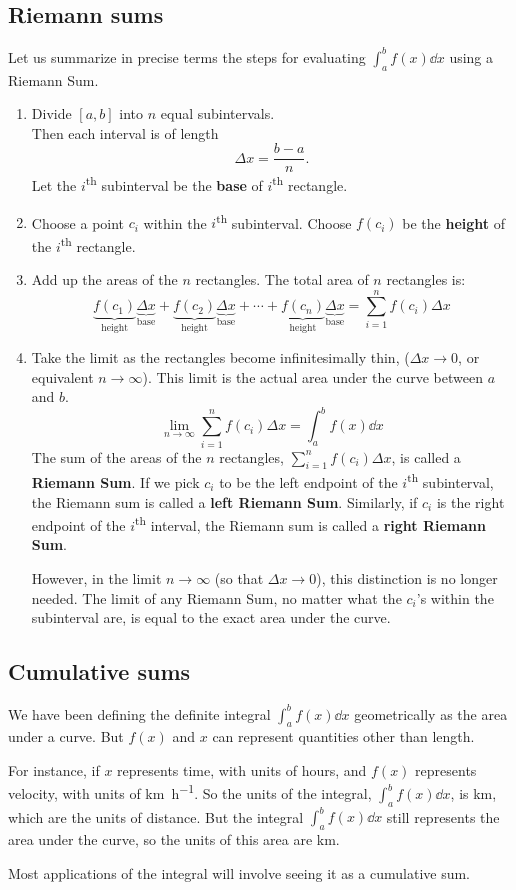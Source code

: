 \subsection{Riemann sums}
Let us summarize in precise terms the steps for evaluating $\int_a^bf(x)\dd x$ using a Riemann Sum.
\begin{enumerate}
\item Divide $[a,b]$ into $n$ equal subintervals.
  \\
  Then each interval is of length
  \[\Delta x=\frac{b-a}n.\]
  Let the $i$\textsuperscript{th} subinterval be the \textbf{base} of $i$\textsuperscript{th} rectangle.
\item Choose a point $c_i$ within the $i$\textsuperscript{th} subinterval. Choose $f(c_i)$ be the \textbf{height} of the $i$\textsuperscript{th} rectangle.
\item Add up the areas of the $n$ rectangles. The total area of $n$ rectangles is:
  \[\underbrace{f(c_1)}_{\text{height}}\underbrace{\Delta x}_{\text{base}}
  +\underbrace{f(c_2)}_{\text{height}}\underbrace{\Delta x}_{\text{base}}
  +\cdots
  +\underbrace{f(c_n)}_{\text{height}}\underbrace{\Delta x}_{\text{base}}
  =\sum_{i=1}^nf(c_i)\Delta x
  \]
\item Take the limit as the rectangles become infinitesimally thin, ($\Delta x\to0$, or equivalent $n\to\infty$). This limit is the actual area under the curve between $a$ and $b$.
  \[\lim_{n\to\infty}\sum_{i=1}^nf(c_i)\Delta x=\int_a^bf(x)\dd x\]
  The sum of the areas of the $n$ rectangles, $\sum_{i=1}^nf(c_i)\Delta x$, is called a \textbf{Riemann Sum}. If we pick $c_i$ to be the left endpoint of the $i$\textsuperscript{th} subinterval, the Riemann sum is called a \textbf{left Riemann Sum}. Similarly, if $c_i$ is the right endpoint of the $i$\textsuperscript{th} interval, the Riemann sum is called a \textbf{right Riemann Sum}.

  However, in the limit $n\to\infty$ (so that $\Delta x\to0$), this distinction is no longer needed. The limit of any Riemann Sum, no matter what the $c_i$'s within the subinterval are, is equal to the exact area under the curve.
\end{enumerate}
\subsection{Cumulative sums}
We have been defining the definite integral $\int_a^bf(x)\dd x$ geometrically as the area under a curve. But $f(x)$ and $x$ can represent quantities other than length.

For instance, if $x$ represents time, with units of hours, and $f(x)$ represents velocity, with units of \unit[per-mode=single-symbol]{\km\per\hour}. So the units of the integral, $\int_a^bf(x)\dd x$, is \unit{\km}, which are the units of distance. But the integral $\int_a^bf(x)\dd x$ still represents the area under the curve, so the units of this area are \unit{\km}.

Most applications of the integral will involve seeing it as a cumulative sum.
